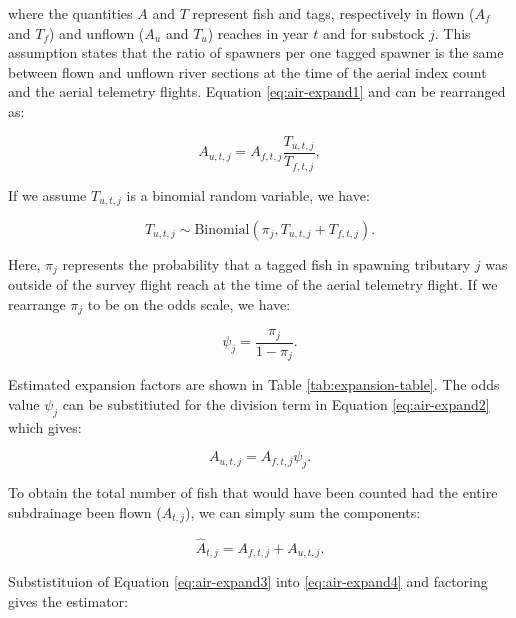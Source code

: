 \documentclass[12pt,]{book}
\theoremstyle{definition}
\theoremstyle{definition}
\theoremstyle{definition}
\theoremstyle{remark}
\begin{document}
\noindent
where the quantities \(A\) and \(T\) represent fish and tags,
respectively in flown (\(A_f\) and \(T_f\)) and unflown (\(A_u\) and
\(T_u\)) reaches in year \(t\) and for substock \(j\). This assumption
states that the ratio of spawners per one tagged spawner is the same
between flown and unflown river sections at the time of the aerial index
count and the aerial telemetry flights. Equation \eqref{eq:air-expand1}
and can be rearranged as:

\begin{equation}
  A_{u,t,j} = A_{f,t,j} \frac{T_{u,t,j}}{T_{f,t,j}},
  \label{eq:air-expand2}
\end{equation}

\noindent
If we assume \(T_{u,t,j}\) is a binomial random variable, we have:

\begin{equation}
  T_{u,t,j} \sim \text{Binomial}(\pi_j,T_{u,t,j} + T_{f,t,j}).
  \label{eq:air-expand-binomial}
\end{equation}

\noindent
Here, \(\pi_j\) represents the probability that a tagged fish in
spawning tributary \(j\) was outside of the survey flight reach at the
time of the aerial telemetry flight. If we rearrange \(\pi_j\) to be on
the odds scale, we have:

\begin{equation}
  \psi_j=\frac{\pi_j}{1-\pi_j}.
  \label{eq:air-expand-odds}
\end{equation}

\noindent
Estimated expansion factors are shown in Table
\ref{tab:expansion-table}. The odds value \(\psi_j\) can be substitiuted
for the division term in Equation \eqref{eq:air-expand2} which gives:

\begin{equation}
  A_{u,t,j} = A_{f,t,j} \psi_j.
  \label{eq:air-expand3}
\end{equation}

\noindent
To obtain the total number of fish that would have been counted had the
entire subdrainage been flown (\(\hat{A}_{t,j}\)), we can simply sum the
components:

\begin{equation}
  \hat{A}_{t,j} = A_{f,t,j} + A_{u,t,j}.
  \label{eq:air-expand4}
\end{equation}

\noindent
Substistituion of Equation \eqref{eq:air-expand3} into
\eqref{eq:air-expand4} and factoring gives the estimator:
\end{document}
